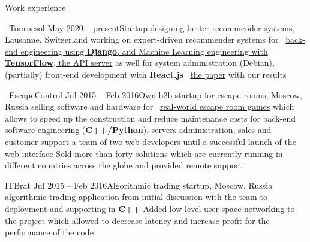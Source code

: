 \documentclass{resume} %
\newcommand*{\img}[1]{%
	\raisebox{-.02\baselineskip}{%
		\texttt{[image: \#1]}%
	}%
}
\newcommand*{\emoji}[1]{\img{./emoji/#1.png}}
\newcommand{\mylink}{{\color{gray}\faExternalLink}}
\begin{document}
\begin{rSection}{Work experience}

	\begin{rSubsection}{\mylink~\href{http://tournesol.app}{Tournesol \emoji{sunflower}}}{May 2020 -- present}{Startup designing better recommender systems, Lausanne, Switzerland \emoji{flag-ch}}{}
		 working on expert-driven recommender systems
		 for \mylink~\href{https://github.com/tournesol-app/tournesol}{back-end engineering using {\bf Django}, and Machine Learning engineering with {\bf TensorFlow}, the API server}
		 as well for system administration (Debian), (partially) front-end development with {\bf React.js}
		 \mylink~\href{https://arxiv.org/abs/2107.07334}{the  paper} with our results
	\end{rSubsection}

	\begin{rSubsection}{\mylink~\href{http://escape-control.com}{EscapeControl \emoji{old-key}}}{Jul 2015 -- Feb 2016}{Own b2b startup for escape rooms, Moscow, Russia \emoji{flag-ru}}{}
		 selling software and hardware for \mylink~\href{https://www.youtube.com/watch?v=kXbubjs7aTA}{real-world escape room games} which allows to speed up the construction and reduce maintenance costs
		 for back-end software engineering ({\bf C++/Python}), servers administration, sales and customer support
		 a team of two web developers until a successful launch of the web interface
		\myitem Sold more than forty solutions which are currently running in different countries across the globe and provided remote support
	\end{rSubsection}

	\begin{rSubsection}{ITBrat \emoji{stocks}}{Jul 2015 -- Feb 2016}{Algorithmic trading startup, Moscow, Russia \emoji{flag-ru}}{}
		 algorithmic trading application from initial discussion with the team to deployment and supporting in {\bf C++}
		\myitem Added low-level user-space networking to the project which allowed to decrease latency and increase profit
		 for the performance of the code
	\end{rSubsection}


\end{rSection}
\end{document}
